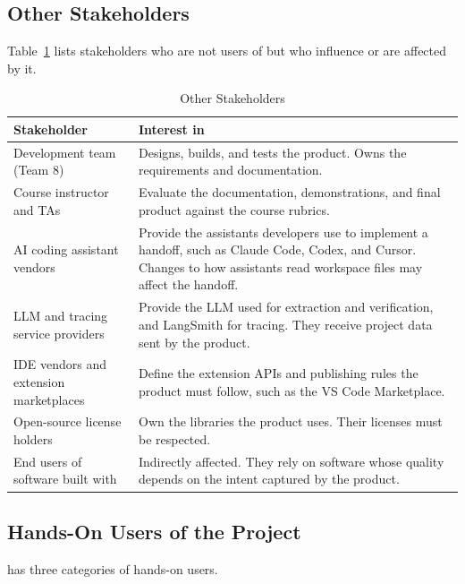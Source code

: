 \documentclass[12pt]{article}
\begin{document}
\subsection{Other Stakeholders}

Table~\ref{TblOtherStakeholders} lists stakeholders who are not users of
\progname{} but who influence or are affected by it.

\begin{table}[h!]
\centering
\caption{Other Stakeholders}
\label{TblOtherStakeholders}
\begin{tabularx}{\textwidth}{p{4.2cm}X}
\toprule
\textbf{Stakeholder} & \textbf{Interest in \progname{}} \\
\midrule
Development team (Team 8) & Designs, builds, and tests the product. Owns the
requirements and documentation. \\
Course instructor and TAs & Evaluate the documentation, demonstrations, and
final product against the course rubrics. \\
AI coding assistant vendors & Provide the assistants developers use to
implement a handoff, such as Claude Code, Codex, and Cursor. Changes to how
assistants read workspace files may affect the handoff. \\
LLM and tracing service providers & Provide the LLM used for extraction and
verification, and LangSmith for tracing. They receive project data sent by the
product. \\
IDE vendors and extension marketplaces & Define the extension APIs and
publishing rules the product must follow, such as the VS Code Marketplace. \\
Open-source license holders & Own the libraries the product uses. Their
licenses must be respected. \\
End users of software built with \progname{} & Indirectly affected. They rely
on software whose quality depends on the intent captured by the product. \\
\bottomrule
\end{tabularx}
\end{table}

\subsection{Hands-On Users of the Project}

\progname{} has three categories of hands-on users.
\end{document}
